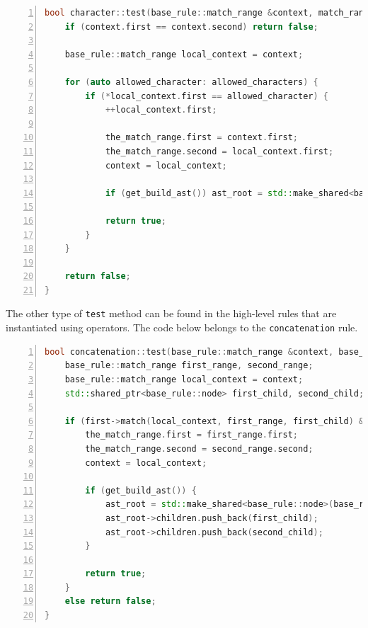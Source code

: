 \documentclass[12pt]{article}
\begin{document}
\begin{center}
	\begin{minipage}[ht]{0.95\textwidth}
		\begin{lstlisting}[language=C++, breaklines=true, numbers=left]
bool character::test(base_rule::match_range &context, match_range &the_match_range, std::shared_ptr<base_rule::node> &ast_root) {
	if (context.first == context.second) return false;

	base_rule::match_range local_context = context;

	for (auto allowed_character: allowed_characters) {
		if (*local_context.first == allowed_character) {
			++local_context.first;

			the_match_range.first = context.first;
			the_match_range.second = local_context.first;
			context = local_context;

			if (get_build_ast()) ast_root = std::make_shared<base_rule::node>(std::string(the_match_range.first, the_match_range.second)); 

			return true;
		}
	}

	return false;
}
		\end{lstlisting}
	\end{minipage}
\end{center}

The other type of \texttt{test} method can be found in the high-level rules that are instantiated using
operators. The code below belongs to the \texttt{concatenation} rule.

\begin{center}
	\begin{minipage}[ht]{0.95\textwidth}
		\begin{lstlisting}[language=C++, breaklines=true, numbers=left]
bool concatenation::test(base_rule::match_range &context, base_rule::match_range &the_match_range, std::shared_ptr<base_rule::node> &ast_root) {
	base_rule::match_range first_range, second_range;
	base_rule::match_range local_context = context;
	std::shared_ptr<base_rule::node> first_child, second_child;

	if (first->match(local_context, first_range, first_child) && second->match(local_context, second_range, second_child)) {
		the_match_range.first = first_range.first;
		the_match_range.second = second_range.second;
		context = local_context;

		if (get_build_ast()) {
			ast_root = std::make_shared<base_rule::node>(base_rule::node::type::concatenation);
			ast_root->children.push_back(first_child);
			ast_root->children.push_back(second_child);
		}

		return true;
	}
	else return false;
}
		\end{lstlisting}
	\end{minipage}
\end{center}
\end{document}
